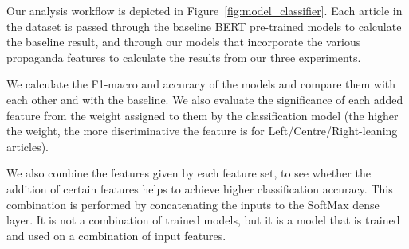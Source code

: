 

Our analysis workflow %
is depicted in Figure~\ref{fig:model_classifier}. Each article in the dataset is passed through the baseline BERT pre-trained models to calculate the baseline result, and through our models that incorporate the various propaganda features to calculate the results from our three experiments. %



We calculate the F1-macro and accuracy of the models and compare them with each other and with the baseline. %
We also evaluate the significance of each added feature from the weight assigned to them %
by the classification model (the higher the weight, the more discriminative the feature is for Left/Centre/Right-leaning articles). %

We also combine the features given by each feature set, to see whether the addition of certain features helps to achieve higher classification accuracy. %
This combination is performed by concatenating the inputs to the SoftMax dense layer. It is not a combination of trained models, but it is a model that is trained and used on a combination of input features.



